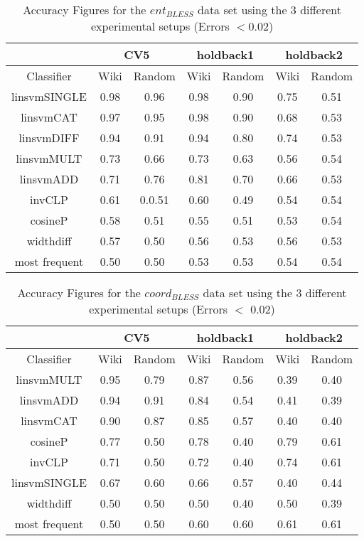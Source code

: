 \documentclass[11pt]{article}
\begin{document}
\begin{table*}[ht]
\centering
\begin{tabular}{|c|c|c|c|c|c|c|}
\hline
&\multicolumn{2}{|c|}{CV5}&\multicolumn{2}{|c|}{holdback1}&\multicolumn{2}{|c|}{holdback2}\\
\hline
Classifier&Wiki&Random&Wiki&Random&Wiki&Random\\
\hline
linsvmSINGLE&0.98&0.96&0.98&0.90&0.75&0.51\\
linsvmCAT&0.97&0.95&0.98&0.90&0.68&0.53\\
linsvmDIFF&0.94&0.91&0.94&0.80&0.74&0.53\\
linsvmMULT&0.73&0.66&0.73&0.63&0.56&0.54\\
linsvmADD&0.71&0.76&0.81&0.70&0.66&0.53\\
invCLP&0.61&0.0.51&0.60&0.49&0.54&0.54\\
cosineP&0.58&0.51&0.55&0.51&0.53&0.54\\
widthdiff&0.57&0.50&0.56&0.53&0.56&0.53\\
most frequent&0.50&0.50&0.53&0.53&0.54&0.54\\
\hline
\end{tabular}
\caption{Accuracy Figures for the \emph{$ent_{BLESS}$} data set using the 3 different experimental setups (Errors $< $0.02)}
\label{table:results_ent_bless}
\end{table*}

\begin{table*}[ht]
\centering
\begin{tabular}{|c|c|c|c|c|c|c|}
\hline
&\multicolumn{2}{|c|}{CV5}&\multicolumn{2}{|c|}{holdback1}&\multicolumn{2}{|c|}{holdback2}\\
\hline
Classifier&Wiki&Random&Wiki&Random&Wiki&Random\\
\hline
linsvmMULT&0.95&0.79&0.87&0.56&0.39&0.40\\
linsvmADD&0.94&0.91&0.84&0.54&0.41&0.39\\
linsvmCAT&0.90&0.87&0.85&0.57&0.40&0.40\\
cosineP&0.77&0.50&0.78&0.40&0.79&0.61\\
invCLP&0.71&0.50&0.72&0.40&0.74&0.61\\
linsvmSINGLE&0.67&0.60&0.66&0.57&0.40&0.44\\
widthdiff&0.50&0.50&0.50&0.40&0.50&0.39\\
most frequent&0.50&0.50&0.60&0.60&0.61&0.61\\
\hline
\end{tabular}
\caption{Accuracy Figures for the \emph{$coord_{BLESS}$} data set using the 3 different experimental setups (Errors $<$ 0.02)}
\label{table:results_coord_bless}
\end{table*}
\end{document}
